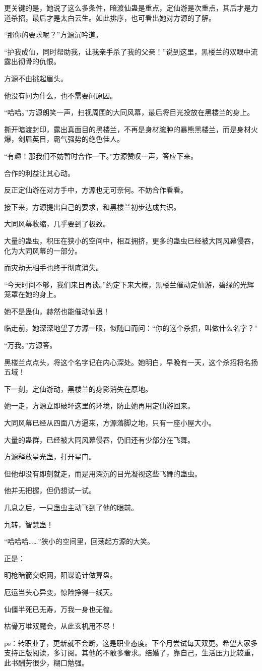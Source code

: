 \begin{this_body}
更关键的是，她说了这么多条件，暗渡仙蛊是重点，定仙游是次重点，其后才是力道杀招，最后才是太白云生。如此排序，也可看出她对方源的了解。

“那你的要求呢？”方源沉吟道。

“护我成仙，同时帮助我，让我亲手杀了我的父亲！”说到这里，黑楼兰的双眼中流露出彻骨的仇恨。

方源不由挑起眉头。

他没有问为什么，也不需要问原因。

“哈哈。”方源朗笑一声，扫视周围的大同风幕，最后将目光投放在黑楼兰的身上。

撕开暗渡封印，露出真面目的黑楼兰，不再是身材臃肿的暴熊黑楼兰，而是身材火爆，剑眉英目，霸气强势的绝色佳人。

“有趣！那我们不妨暂时合作一下。”方源赞叹一声，答应下来。

合作的利益让其心动。

反正定仙游在对方手中，方源也无可奈何。不妨合作看看。

接下来，方源提出自己的要求，和黑楼兰初步达成共识。

大同风幕收缩，几乎要到了极致。

大量的蛊虫，积压在狭小的空间中，相互拥挤，更多的蛊虫已经被大同风幕侵吞，化为大同风幕的一部分。

而灾劫无相手也终于彻底消失。

“今天时间不够，我们来日再谈。”约定下来大概，黑楼兰催动定仙游，碧绿的光辉笼罩在她的身上。

她不是蛊仙，赫然也能催动仙蛊！

临走前，她深深地望了方源一眼，似随口而问：“你的这个杀招，叫做什么名字？”

“万我。”方源答。

黑楼兰点点头，将这个名字记在内心深处。她明白，早晚有一天，这个杀招将名扬五域！

下一刻，定仙游动，黑楼兰的身影消失在原地。

她一走，方源立即破坏这里的环境，防止她再用定仙游回来。

大同风幕已经从四面八方逼来，方源落脚之地，只有一座小屋大小。

大量的蛊群，已经被大同风幕侵吞，仍旧还有少部分在飞舞。

方源释放星光蛊，打开星门。

但他却没有即刻就走，而是用深沉的目光凝视这些飞舞的蛊虫。

他并无把握，但仍想试一试。

几息之后，一只蛊虫主动飞到了他的眼前。

九转，智慧蛊！

“哈哈哈……”狭小的空间里，回荡起方源的大笑。

正是：

明枪暗箭交织网，阳谋诡计做算盘。

厄运当头心异变，惊险挣得一线天。

仙僵半死已无寿，万我一身也无徨。

枯骨万堆双魔会，从此玄机用不尽！

ps：转职业了，更新就不会断，这是职业态度。下个月尝试每天双更。希望大家多支持正版阅读，多订阅。其他的不敢多奢求。结婚了，靠自己，生活压力比较重，此书酬劳很少，糊口勉强。

\end{this_body}

